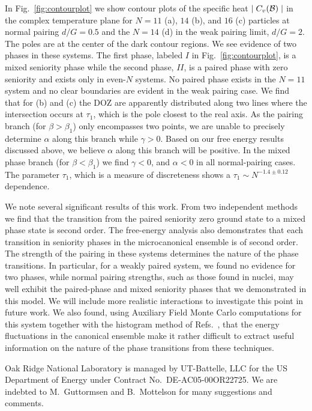 \begin{multicols}{2}
In Fig.~\ref{fig:contourplot} we show contour 
plots of the specific heat $\mid C_v({\cal B})\mid $
in the complex temperature plane
for $N=11$ (a), $14$ (b), and $16$ (c) particles at normal 
pairing $d/G=0.5$ and
the $N=14$ (d) in the weak pairing limit, $d/G=2$. 
The poles are at the center of the dark contour regions.  We see evidence
of two phases in these systems. The first phase, labeled $I$ in 
Fig.~\ref{fig:contourplot}, is a mixed seniority phase while the 
second phase, $II$, is a paired phase with zero seniority and exists
only in even-$N$ systems.  No paired phase exists in 
the $N=11$ system and no clear boundaries are evident 
in the weak pairing case. We find that for (b) and (c) the 
DOZ are apparently distributed along two lines where the 
intersection occurs at $\tau_1$, which is the pole closest to 
the real axis. As the pairing branch (for $\beta >\beta_1$) 
only encompasses two points, we are unable to precisely 
determine $\alpha$ along this branch while $\gamma>0$. Based on
our free energy results discussed above, we believe $\alpha$ 
along this branch will be positive. In the mixed phase branch
(for $\beta<\beta_1$) we find $\gamma<0$, and $\alpha < 0$ in
all normal-pairing cases. The parameter $\tau_1$, which is a measure
of discreteness shows a $\tau_1\sim N^{-1.4 \pm 0.12}$ dependence. 

We note several significant results of this work. From two 
independent methods we find that the transition from the paired seniority
zero ground state to a mixed phase state is second order. The free-energy
analysis also demonstrates that each transition in seniority phases in 
the microcanonical ensemble is of second order. The strength of the
pairing in these systems determines the nature of the phase transitions. 
In particular, for a weakly paired system, we found no evidence 
for two phases, while normal pairing strengths, such as those
found in nuclei, may well exhibit the paired-phase and mixed seniority
phases that we demonstrated in this model. We will include more realistic
interactions to investigate this point in future work. 
We also found, using Auxiliary Field Monte Carlo 
computations for this system \cite{kdl97} together 
with the histogram method of Refs.~\cite{prl90,fs88}, that the energy
fluctuations in the canonical ensemble 
make it rather difficult to extract useful information
on the nature of the phase transitions from these techniques. 

Oak Ridge National Laboratory is
managed by UT-Battelle, LLC for the US Department of Energy 
under Contract No.~DE-AC05-00OR22725. We are indebted to M.~Guttormsen 
and B.~Mottelson for many suggestions and comments.


\end{multicols}
